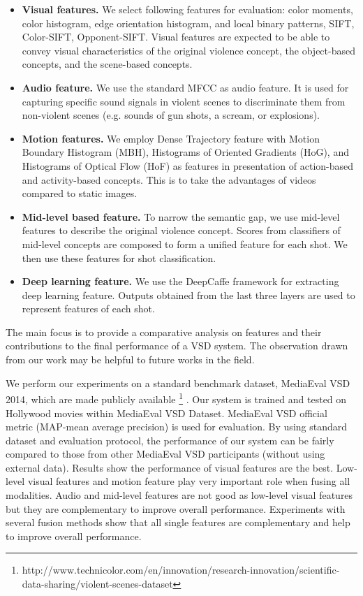 \documentclass[twocolumn]{bmcart}%
\begin{document}
\begin{itemize}
	\item {\bf Visual features.} We select following features for evaluation: color moments, color histogram, edge orientation histogram, and local binary patterns, SIFT, Color-SIFT, Opponent-SIFT. Visual features are expected to be able to convey visual characteristics of the original violence concept, the object-based concepts, and the scene-based concepts.
	\item {\bf Audio feature.} We use the standard MFCC as audio feature. It is used for capturing specific sound signals in violent scenes to discriminate them from non-violent scenes (e.g. sounds of gun shots, a scream, or explosions). 
	\item {\bf Motion features.} We employ Dense Trajectory feature with Motion Boundary Histogram (MBH), Histograms of Oriented Gradients (HoG), and Histograms of Optical Flow (HoF) as features in presentation of action-based and activity-based concepts. This is to take the advantages of videos compared to static images.  
	\item {\bf Mid-level based feature.} To narrow the semantic gap, we use mid-level features to describe the original violence concept. Scores from classifiers of mid-level concepts are composed to form a unified feature for each shot. We then use these features for shot classification.
	\item {\bf Deep learning feature.} We use the DeepCaffe framework for extracting deep learning feature. Outputs obtained from the last three layers are used to represent features of each shot. 
\end{itemize}
The main focus is to provide a comparative analysis on features and their contributions to the final performance of a VSD system. The observation drawn from our work may be helpful to future works in the field.

We perform our experiments on a standard benchmark dataset, MediaEval VSD 2014\cite{demarty2014benchmarking}, which are made publicly available \footnote{http://www.technicolor.com/en/innovation/research-innovation/scientific-data-sharing/violent-scenes-dataset} . Our system is trained and tested on Hollywood movies within MediaEval VSD Dataset. MediaEval VSD official metric (MAP-mean average precision) is used for evaluation. By using standard dataset and evaluation protocol, the performance of our system can be fairly compared to those from other MediaEval VSD participants (without using external data). Results show the performance of visual features are the best. Low-level visual features and motion feature play very important role when fusing all modalities. Audio and mid-level features are not good as low-level visual features but they are complementary to improve overall performance. Experiments with several fusion methods show that all single features are complementary and help to improve overall performance.
\end{document}
